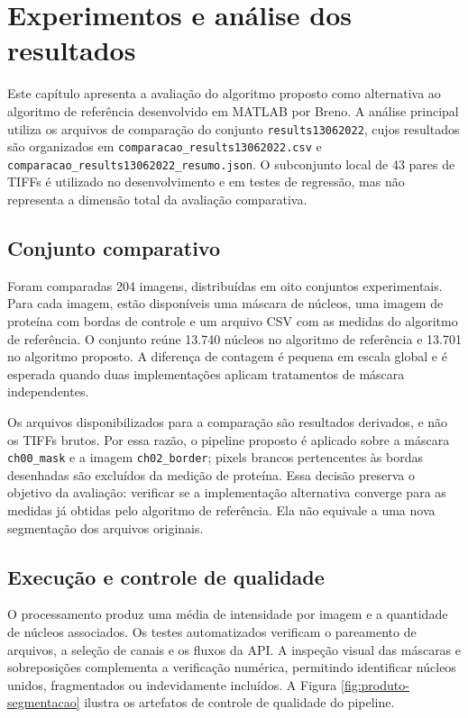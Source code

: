 \chapter{Experimentos e análise dos resultados}
\label{cap:experimentos}

Este capítulo apresenta a avaliação do algoritmo proposto como alternativa ao algoritmo de referência desenvolvido em MATLAB por Breno. A análise principal utiliza os arquivos de comparação do conjunto \texttt{results13062022}, cujos resultados são organizados em \texttt{comparacao\_results13062022.csv} e \texttt{comparacao\_results13062022\_resumo.json}. O subconjunto local de 43 pares de TIFFs é utilizado no desenvolvimento e em testes de regressão, mas não representa a dimensão total da avaliação comparativa.

\section{Conjunto comparativo}

Foram comparadas 204 imagens, distribuídas em oito conjuntos experimentais. Para cada imagem, estão disponíveis uma máscara de núcleos, uma imagem de proteína com bordas de controle e um arquivo CSV com as medidas do algoritmo de referência. O conjunto reúne 13.740 núcleos no algoritmo de referência e 13.701 no algoritmo proposto. A diferença de contagem é pequena em escala global e é esperada quando duas implementações aplicam tratamentos de máscara independentes.

Os arquivos disponibilizados para a comparação são resultados derivados, e não os TIFFs brutos. Por essa razão, o pipeline proposto é aplicado sobre a máscara \texttt{ch00\_mask} e a imagem \texttt{ch02\_border}; pixels brancos pertencentes às bordas desenhadas são excluídos da medição de proteína. Essa decisão preserva o objetivo da avaliação: verificar se a implementação alternativa converge para as medidas já obtidas pelo algoritmo de referência. Ela não equivale a uma nova segmentação dos arquivos originais.

\section{Execução e controle de qualidade}

O processamento produz uma média de intensidade por imagem e a quantidade de núcleos associados. Os testes automatizados verificam o pareamento de arquivos, a seleção de canais e os fluxos da API. A inspeção visual das máscaras e sobreposições complementa a verificação numérica, permitindo identificar núcleos unidos, fragmentados ou indevidamente incluídos. A Figura \ref{fig:produto-segmentacao} ilustra os artefatos de controle de qualidade do pipeline.

